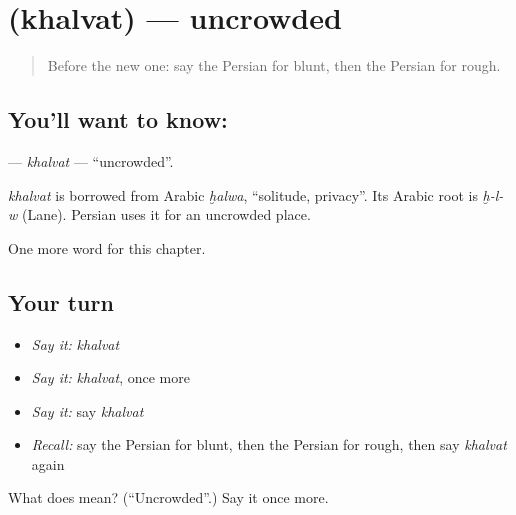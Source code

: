 \section[\texorpdfstring{\fa{خلوت} (khalvat)}{خلوت (khalvat)}]{ (khalvat) — uncrowded}

\label{lesson:FA-C164-khalvat}



\begin{quote}
Before the new one: say the Persian for blunt, then the Persian for rough.
\end{quote}

\subsection*{You'll want to know: }
\textbf{} — \emph{khalvat} — \textquotedblleft{}uncrowded\textquotedblright{}.

\begin{cousinweb}
\emph{khalvat} is borrowed from Arabic \emph{ḫalwa}, \textquotedblleft{}solitude, privacy\textquotedblright{}. Its Arabic root is \emph{ḫ-l-w} (Lane). Persian uses it for an uncrowded place.
\end{cousinweb}

\begin{grammarlens}[title={What you've built}]
One more word for this chapter.
\end{grammarlens}

\subsection*{Your turn}
\begin{itemize}
\raggedright
  \item \emph{Say it:} \emph{khalvat}
  \item \emph{Say it:} \emph{khalvat}, once more
  \item \emph{Say it:} say \emph{khalvat}
  \item \emph{Recall:} say the Persian for blunt, then the Persian for rough, then say \emph{khalvat} again
\end{itemize}

\begin{tcolorbox}[breakable,colback=teal!4,colframe=teal!35!black,title={Before you move on}]
What does  mean? (\textquotedblleft{}Uncrowded\textquotedblright{}.) Say it once more.
\end{tcolorbox}
